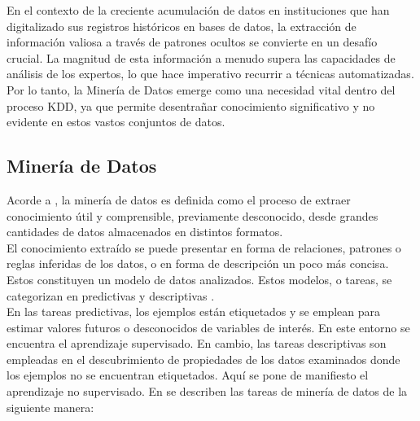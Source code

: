 En el contexto de la creciente acumulación de datos en instituciones que han digitalizado sus registros históricos en bases de datos, la extracción de información valiosa a través de patrones ocultos se convierte en un desafío crucial. La magnitud de esta información a menudo supera las capacidades de análisis de los expertos, lo que hace imperativo recurrir a técnicas automatizadas. Por lo tanto, la Minería de Datos emerge como una necesidad vital dentro del proceso KDD, ya que permite desentrañar conocimiento significativo y no evidente en estos vastos conjuntos de datos.

\subsection{Minería de Datos}
Acorde a \citep{orallo2004}, la minería de datos es definida como el proceso de extraer conocimiento útil y comprensible, previamente desconocido, desde grandes cantidades de datos almacenados en distintos formatos. \\
El conocimiento extraído se puede presentar en forma de relaciones, patrones o reglas inferidas de los datos, o en forma de descripción un poco más concisa. Estos constituyen un modelo de datos analizados. Estos modelos, o tareas, se categorizan en predictivas y descriptivas \citep{orallo2004}. \\
En las tareas predictivas, los ejemplos están etiquetados y se emplean para estimar valores futuros o desconocidos de variables de interés. En este entorno se encuentra el aprendizaje supervisado. En cambio, las tareas descriptivas son empleadas en el descubrimiento de propiedades de los datos examinados donde los ejemplos no se encuentran etiquetados. Aquí se pone de manifiesto el aprendizaje no supervisado. En \citep{orallo2004} se describen las tareas de minería de datos de la siguiente manera:
